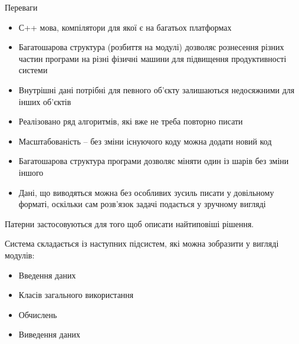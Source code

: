 Переваги

\begin{itemize}
\item
  С++ мова, компілятори для якої є на багатьох платформах
\item
  Багатошарова структура (розбиття на модулі) дозволяє рознесення різних
  частин програми на різні фізичні машини для підвищення продуктивності
  системи
\item
  Внутрішні дані потрібні для певного об'єкту залишаються недосяжними
  для інших об'єктів
\item
  Реалізовано ряд алгоритмів, які вже не треба повторно писати
\item
  Масштабованість -- без зміни існуючого коду можна додати новий код
\item
  Багатошарова структура програми дозволяє міняти один із шарів без
  зміни іншого
\item
  Дані, що виводяться можна без особливих зусиль писати у довільному
  форматі, оскільки сам розв'язок задачі подається у зручному вигляді
\end{itemize}

Патерни застосовуються для того щоб описати найтиповіші рішення.

Система складається із наступних підсистем, які можна зобразити у
вигляді модулів:

\begin{itemize}
\item
  Введення даних
\item
  Класів загального використання
\item
  Обчислень
\item
  Виведення даних
\end{itemize}
